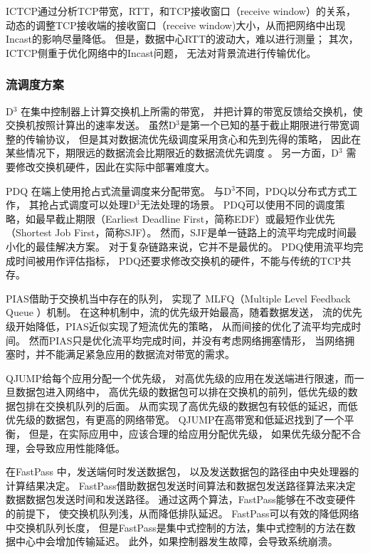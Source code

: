 ICTCP\cite{ICTCP}通过分析TCP带宽，RTT，和TCP接收窗口（receive window）的关系，
动态的调整TCP接收端的接收窗口（receive window)大小，从而把网络中出现Incast的影响尽量降低。
但是，数据中心RTT的波动大，难以进行测量；
其次，ICTCP侧重于优化网络中的Incast问题，
无法对背景流进行传输优化。

\subsubsection{流调度方案}
 
D$^{3}$ \cite{D3}在集中控制器上计算交换机上所需的带宽，
并把计算的带宽反馈给交换机，使交换机按照计算出的速率发送。
虽然D$^{3}$是第一个已知的基于截止期限进行带宽调整的传输协议，
但是其对数据流优先级调度采用贪心和先到先得的策略，
因此在某些情况下，期限远的数据流会比期限近的数据流优先调度 \cite{D3}。
另一方面，D$^{3}$ 需要修改交换机硬件，因此在实际中部署难度大。

PDQ \cite{PDQ}在端上使用抢占式流量调度来分配带宽。
与D$^{3}$不同，PDQ以分布式方式工作，
其抢占式调度可以处理D$^{3}$无法处理的场景。
PDQ可以使用不同的调度策略，如最早截止期限（Earliest Deadline First，简称EDF）或最短作业优先（Shortest Job First，简称SJF）。
然而，SJF是单一链路上的流平均完成时间最小化的最佳解决方案。
对于复杂链路来说，它并不是最优的。
PDQ使用流平均完成时间被用作评估指标，
PDQ还要求修改交换机的硬件，不能与传统的TCP共存。
 
 PIAS\cite{bai2015information}借助于交换机当中存在的队列， 
 实现了 MLFQ（Multiple Level Feedback Queue ）机制。
 在这种机制中，流的优先级开始最高，随着数据发送，
 流的优先级开始降低，PIAS近似实现了短流优先的策略，
 从而间接的优化了流平均完成时间。
 然而PIAS只是优化流平均完成时间，并没有考虑网络拥塞情形，
 当网络拥塞时，并不能满足紧急应用的数据流对带宽的需求。
 
 
QJUMP\cite{grosvenor2015queues}给每个应用分配一个优先级，
对高优先级的应用在发送端进行限速，而一旦数据包进入网络中，
高优先级的数据包可以排在交换机的前列，低优先级的数据包排在交换机队列的后面。
从而实现了高优先级的数据包有较低的延迟，而低优先级的数据包，有更高的网络带宽。
QJUMP在高带宽和低延迟找到了一个平衡，
但是，在实际应用中，应该合理的给应用分配优先级，
如果优先级分配不合理，会导致应用性能降低。
 
 
在FastPass \cite{perry2015fastpass}中，发送端何时发送数据包，
以及发送数据包的路径由中央处理器的计算结果决定。
FastPass借助数据包发送时间算法和数据包发送路径算法来决定数据数据包发送时间和发送路径。
通过这两个算法，FastPass能够在不改变硬件的前提下，
使交换机队列浅，从而降低排队延迟。
FastPass可以有效的降低网络中交换机队列长度，
但是FastPass是集中式控制的方法，集中式控制的方法在数据中心中会增加传输延迟。
此外，如果控制器发生故障，会导致系统崩溃。

